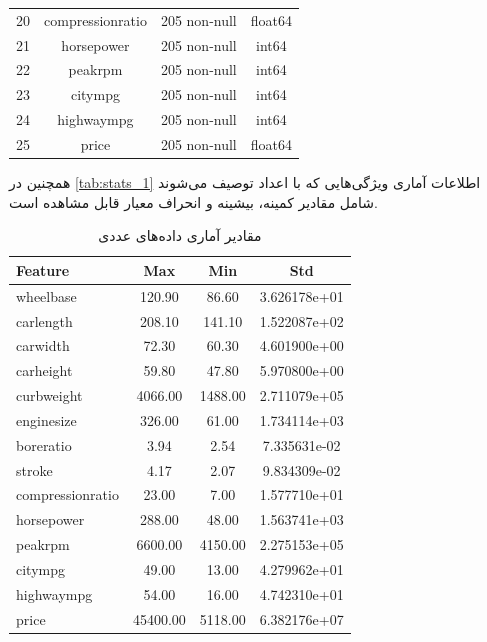 \documentclass[11pt]{article}
\begin{document}
\begin{table}[h!]
\begin{latin}
{\begin{tabular}{cccc}
				20 & compressionratio   & 205 non-null   & float64 \\ 
				21 & horsepower         & 205 non-null   & int64   \\ 
				22 & peakrpm            & 205 non-null   & int64   \\ 
				23 & citympg            & 205 non-null   & int64   \\ 
				24 & highwaympg         & 205 non-null   & int64   \\ 
				25 & price              & 205 non-null   & float64 \\ 
				\bottomrule
		\end{tabular}
		}
		\end{latin}
		\label{tab:dataframe_info1}
	\end{table}
	همچنین در
	\autoref{tab:stats_1}
	اطلاعات آماری ویژگی‌هایی که با اعداد توصیف می‌شوند شامل مقادیر کمینه، بیشینه و انحراف معیار قابل مشاهده است.
	\begin{table}[h!]
		\centering
		\caption{مقادیر آماری داده‌های عددی}
		\begin{latin}
			{\scriptsize
		\begin{tabular}{lccc}
			\toprule
			Feature           & Max     & Min     & Std    \\ 
			\midrule
			wheelbase         & 120.90  & 86.60    & 3.626178e+01   \\ 
			carlength         & 208.10  & 141.10    & 1.522087e+02   \\ 
			carwidth          & 72.30   & 60.30    & 4.601900e+00   \\ 
			carheight         & 59.80   & 47.80    & 5.970800e+00   \\ 
			curbweight        & 4066.00 & 1488.00    & 2.711079e+05   \\ 
			enginesize        & 326.00  & 61.00    & 1.734114e+03   \\ 
			boreratio         & 3.94    & 2.54    & 7.335631e-02   \\ 
			stroke            & 4.17    & 2.07	  & 9.834309e-02   \\ 
			compressionratio  & 23.00   & 7.00    & 1.577710e+01   \\ 
			horsepower        & 288.00  & 48.00    & 1.563741e+03   \\ 
			peakrpm           & 6600.00 & 4150.00    & 2.275153e+05   \\ 
			citympg           & 49.00   & 13.00    & 4.279962e+01   \\ 
			highwaympg        & 54.00   & 16.00    & 4.742310e+01   \\ 
			price             & 45400.00& 5118.00    & 6.382176e+07   \\ 
			\bottomrule
		\end{tabular}
		}
		\end{latin}
		\label{tab:stats_1}
	\end{table}
\end{document}
